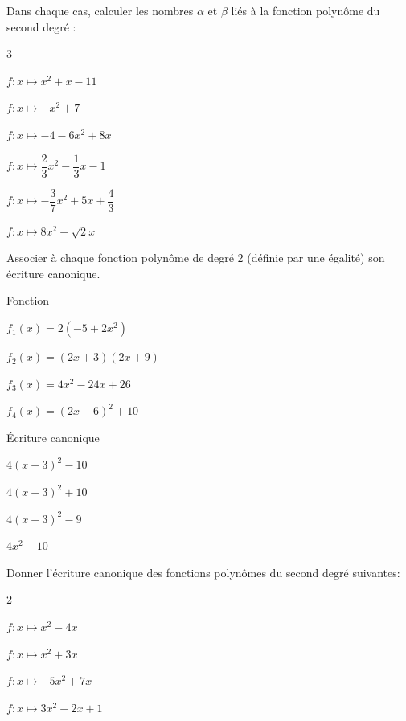 \documentclass[11pt,a4paper]{article}  %
\begin{document}

Dans chaque cas, calculer les nombres $\alpha$ et $\beta$ liés à la fonction polynôme du second degré :
\begin{multicols}{3}
	\begin{enumMet}
		\item $f: x \mapsto x^2+x-11$
		\item $f: x \mapsto-x^2+7$
		\item $f: x \mapsto-4-6 x^2+8 x$
		\item $f: x \mapsto \dfrac{2}{3} x^2-\dfrac{1}{3} x-1$
		\item $f: x \mapsto-\dfrac{3}{7} x^2+5 x+\dfrac{4}{3}$
		\item $f: x \mapsto 8 x^2-\sqrt{2}x$
	\end{enumMet}
\end{multicols}


Associer à chaque fonction polynôme de degré 2 (définie par une égalité) son écriture canonique.

\begin{minipage}[c]{0.45\linewidth}
Fonction
\begin{enumMet}
	\item $f_1(x)=2\left(-5+2 x^2\right)$
	\item $f_2(x)=(2 x+3)(2 x+9)$
	\item $f_3(x)=4 x^2-24 x+26$
	\item $f_4(x)=(2 x-6)^2+10$	
\end{enumMet}
\end{minipage} \hfill
\begin{minipage}[c]{0.45\linewidth}
	Écriture canonique
	\begin{enumMet}[label=\alph*)]
		\item $4(x-3)^2-10$
		\item $4(x-3)^2+10$
		\item $4(x+3)^2-9$
		\item $4 x^2-10$
	\end{enumMet}
\end{minipage}




Donner l'écriture canonique des fonctions polynômes du second degré suivantes:
\begin{multicols}{2}
	\begin{enumMet}
		\item $f: x \mapsto x^2-4 x$
		\item $f: x \mapsto x^2+3 x$
		\item $f: x \mapsto-5 x^2+7 x$
		\item $f: x \mapsto 3 x^2-2 x+1$
	\end{enumMet}
\end{multicols}
\end{document}
